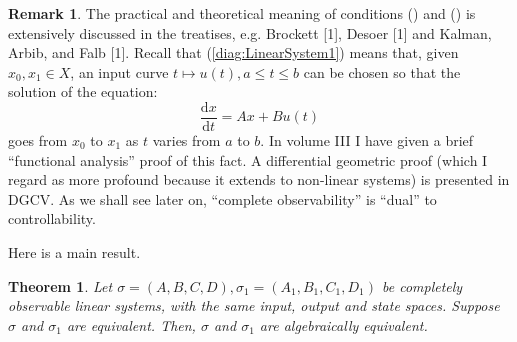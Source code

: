 \documentclass[12pt]{book}
\theoremstyle{plain}
\newtheorem{theorem}{Theorem}[section]
\theoremstyle{definition}
\newtheorem*{remark}{Remark}
\newcommand{\dd}[1]{\mathrm{d}#1}
\begin{document}
\begin{remark}
    The practical and theoretical meaning of conditions () and () is extensively discussed in the treatises, e.g. Brockett [1], Desoer [1] and Kalman, Arbib, and Falb [1]. %
    Recall that (\ref{diag:LinearSystem1}) means that, given $x_0, x_1 \in X$, an input curve $t \mapsto u(t), a \leq t \leq b$ can be chosen so that the solution of the equation:
    $$\frac{\dd{x}}{\dd{t}} = Ax + Bu(t)$$
    goes from $x_0$ to $x_1$ as $t$ varies from $a$ to $b$.
    In volume III I have given a brief ``functional analysis'' proof of this fact.
    A differential geometric proof (which I regard as more profound because it extends to non-linear systems) is presented in DGCV.
    As we shall see later on, ``complete observability'' is ``dual'' to controllability.
\end{remark}

Here is a main result.

\begin{theorem} \label{thm:Equivalence2}
    Let $\sigma = (A, B, C, D), \sigma_1 = (A_1, B_1, C_1, D_1)$ be completely observable linear systems, with the same input, output and state spaces.
    Suppose $\sigma$ and $\sigma_1$ are equivalent. Then, $\sigma$ and $\sigma_1$ are algebraically equivalent.
\end{theorem}
\end{document}
